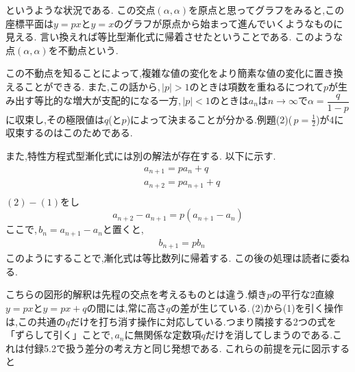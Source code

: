 
  というような状況である.
  この交点$(\alpha,\alpha)$を原点と思ってグラフをみると,この座標平面は$y=px$と$y=x$のグラフが原点から始まって進んでいくようなものに見える.
  言い換えれば等比型漸化式に帰着させたということである.
  このような点$(\alpha,\alpha)$を不動点という.

  この不動点を知ることによって,複雑な値の変化をより簡素な値の変化に置き換えることができる.
  また,この話から,\,$|p|>1$のときは項数を重ねるにつれて$p$が生み出す等比的な増大が支配的になる一方,\,$|p|<1$のときは$a_n$は$n\to\infty$で$\alpha=\dfrac{q}{1-p}$に収束し,その極限値は$q$(と$p$)によって決まることが分かる.例題(2)(\,$p=\frac12$)が$4$に収束するのはこのためである.

  また,特性方程式型漸化式には別の解法が存在する.
  以下に示す.
  \begin{align*}
    &a_{n+1}=pa_n+q \tag*{\(\cdots\) (1)}\\
    &a_{n+2}=pa_{n+1}+q \tag*{\(\cdots\) (2)}\\
  \end{align*}
  $(2)-(1)$をし
  \[
    a_{n+2}-a_{n+1}=p(a_{n+1}-a_n)
  \]
  ここで,\,$b_n=a_{n+1}-a_n$と置くと,
  \begin{align*}
    &b_{n+1}=pb_n
  \end{align*}
  このようにすることで,漸化式は等比数列に帰着する.
  この後の処理は読者に委ねる.

  こちらの図形的解釈は先程の交点を考えるものとは違う.傾き$p$の平行な2直線$y=px$と$y=px+q$の間には,常に高さ$q$の差が生じている.\,(2)から(1)を引く操作は,この共通の$q$だけを打ち消す操作に対応している.つまり隣接する2つの式を「ずらして引く」ことで,\,$a_n$に無関係な定数項$q$だけを消してしまうのである.これは付録5.2で扱う差分の考え方と同じ発想である.
  これらの前提を元に図示すると

